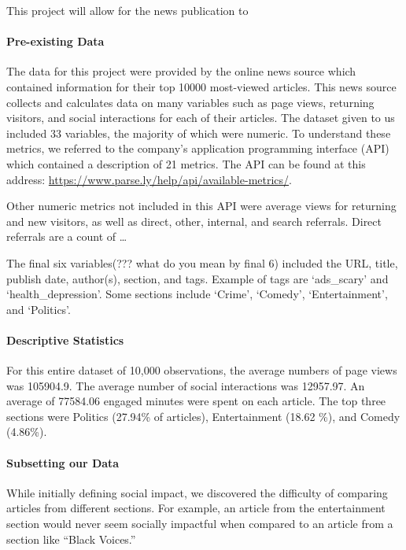 \documentclass[10pt,letterpaper]{article}
\begin{document}
This project will allow for the news publication to

\hypertarget{pre-existing-data}{%
\paragraph{Pre-existing Data}\label{pre-existing-data}}

The data for this project were provided by the online news source which
contained information for their top 10000 most-viewed articles. This
news source collects and calculates data on many variables such as page
views, returning visitors, and social interactions for each of their
articles. The dataset given to us included 33 variables, the majority of
which were numeric. To understand these metrics, we referred to the
company's application programming interface (API) which contained a
description of 21 metrics. The API can be found at this address:
\url{https://www.parse.ly/help/api/available-metrics/}.

Other numeric metrics not included in this API were average views for
returning and new visitors, as well as direct, other, internal, and
search referrals. Direct referrals are a count of \ldots{}

The final six variables(??? what do you mean by final 6) included the
URL, title, publish date, author(s), section, and tags. Example of tags
are `ads\_scary' and `health\_depression'. Some sections include
`Crime', `Comedy', `Entertainment', and `Politics'.

\hypertarget{descriptive-statistics}{%
\paragraph{Descriptive Statistics}\label{descriptive-statistics}}

For this entire dataset of 10,000 observations, the average numbers of
page views was 105904.9. The average number of social interactions was
12957.97. An average of 77584.06 engaged minutes were spent on each
article. The top three sections were Politics (27.94\% of articles),
Entertainment (18.62 \%), and Comedy (4.86\%).

\hypertarget{subsetting-our-data}{%
\paragraph{Subsetting our Data}\label{subsetting-our-data}}

While initially defining social impact, we discovered the difficulty of
comparing articles from different sections. For example, an article from
the entertainment section would never seem socially impactful when
compared to an article from a section like ``Black Voices.''
\end{document}
